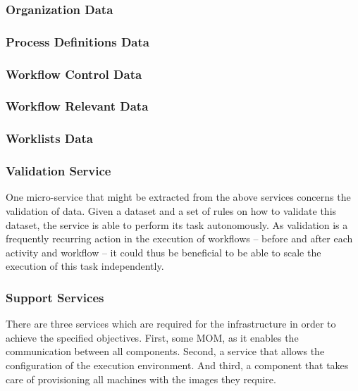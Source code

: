     \subsubsection{Organization Data} %
    \label{subs:organization_data}

    \subsubsection{Process Definitions Data} %
    \label{subs:process_definitions_data}

    \subsubsection{Workflow Control Data} %
    \label{subs:workflow_control_data}

    \subsubsection{Workflow Relevant Data} %
    \label{subs:workflow_relevant_data}

    \subsubsection{Worklists Data} %
    \label{subs:worklists}


  \subsubsection{Validation Service} %
    \label{subs:valitation_service}
    One micro-service that might be extracted from the above services concerns the validation of data. Given a dataset and a set of rules on how to validate this dataset, the service is able to perform its task autonomously. As validation is a frequently recurring action in the execution of workflows -- before and after each activity and workflow -- it could thus be beneficial to be able to scale the execution of this task independently.

  \subsubsection{Support Services} %
  \label{ssub:support_components}
    There are three services which are required for the infrastructure in order to achieve the specified objectives. First, some \ac{MOM}, as it enables the communication between all components. Second, a service that allows the configuration of the execution environment. And third, a component that takes care of provisioning all machines with the images they require.

